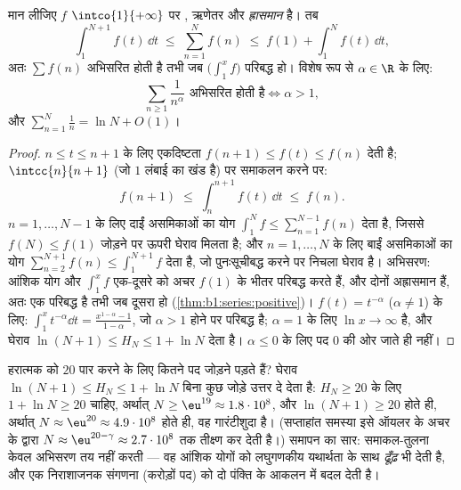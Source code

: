 \begin{theorem}[समाकल-तुलना; रीमान श्रेणी]\label{thm:b1:series:riemann}
मान लीजिए $f$ $\intco{1}{+\infty}$ पर , ऋणेतर और \emph{ह्रासमान} है। तब
\[
\int_1^{N+1} f(t)\,\dd t \;\leq\; \sum_{n=1}^{N} f(n) \;\leq\; f(1)
+ \int_1^{N} f(t)\,\dd t ,
\]
अतः $\sum f(n)$ अभिसरित होती है तभी जब $\bigl(\int_1^x f\bigr)$ परिबद्ध हो।
विशेष रूप से $\alpha \in \R$ के लिए:
\[
\sum_{n \geq 1} \frac{1}{n^\alpha} \text{ अभिसरित होती है}
\iff \alpha > 1,
\]
और $\sum_{n=1}^{N} \frac1n = \ln N + O(1)$।
\end{theorem}

\begin{proof}
$n \leq t \leq n+1$ के लिए एकदिष्टता $f(n+1) \leq f(t) \leq f(n)$ देती है;
$\intcc{n}{n+1}$ (जो $1$ लंबाई का खंड है) पर समाकलन करने पर:
\[
f(n+1) \;\leq\; \int_n^{n+1} f(t)\,\dd t \;\leq\; f(n) .
\]
$n = 1, \dots, N-1$ के लिए दाईं असमिकाओं का योग $\int_1^{N} f \leq
\sum_{n=1}^{N-1} f(n)$ देता है, जिससे $f(N) \leq f(1)$ जोड़ने पर ऊपरी घेराव
मिलता है; और $n = 1, \dots, N$ के लिए बाईं असमिकाओं का योग $\sum_{n=2}^{N+1}
f(n) \leq \int_1^{N+1} f$ देता है, जो पुनःसूचीबद्ध करने पर निचला घेराव है।
अभिसरण: आंशिक योग और  $\int_1^x f$ एक-दूसरे को अचर $f(1)$ के भीतर
परिबद्ध करते हैं, और दोनों अह्रासमान हैं, अतः एक परिबद्ध है तभी जब दूसरा हो
(\cref{thm:b1:series:positive})। $f(t) = t^{-\alpha}$ ($\alpha \neq 1$) के
लिए: $\int_1^x t^{-\alpha}\dd t = \frac{x^{1-\alpha} - 1}{1 - \alpha}$, जो
$\alpha > 1$ होने पर परिबद्ध है; $\alpha = 1$ के लिए  $\ln x \to
\infty$ है, और घेराव $\ln(N+1) \leq H_N \leq 1 + \ln N$ देता है। $\alpha
\leq 0$ के लिए पद $0$ की ओर जाते ही नहीं।
\end{proof}

\begin{example}[हरात्मक ढेर]\label{ex:b1:series:harmonicstack}
हरात्मक  को $20$ पार करने के लिए कितने पद जोड़ने पड़ते हैं? घेराव
$\ln(N+1) \leq H_N \leq 1 + \ln N$ बिना कुछ जोड़े उत्तर दे देता है: $H_N
\geq 20$ के लिए $1 + \ln N \geq 20$ चाहिए, अर्थात् $N \geq \eu^{19} \approx
1.8\cdot10^{8}$, और $\ln(N + 1) \geq 20$ होते ही, अर्थात् $N \approx
\eu^{20} \approx 4.9\cdot10^{8}$ होते ही, वह गारंटीशुदा है। (सप्ताहांत
समस्या इसे ऑयलर के अचर के द्वारा $N \approx \eu^{20 - \gamma} \approx
2.7\cdot10^{8}$ तक तीक्ष्ण कर देती है।) समापन का सार: समाकल-तुलना केवल
अभिसरण तय नहीं करती --- वह आंशिक योगों को लघुगणकीय यथार्थता के साथ
\emph{ढूँढ़} भी देती है, और एक निराशाजनक संगणना (करोड़ों पद) को दो पंक्ति के
आकलन में बदल देती है।
\end{example}

